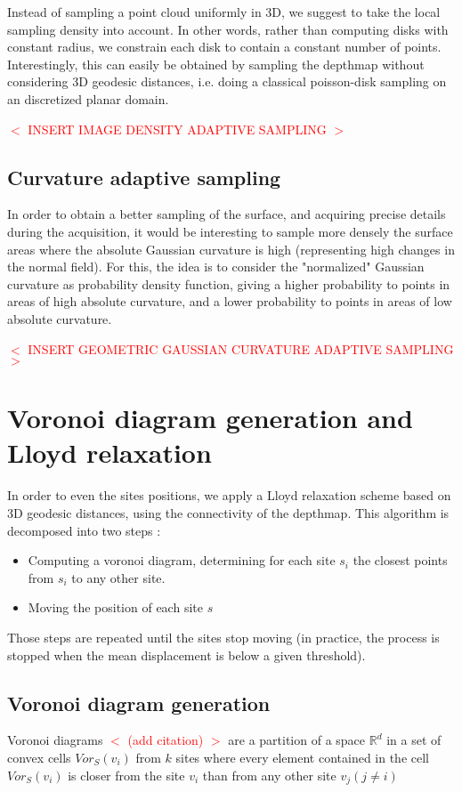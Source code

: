 \documentclass[11pt,fleqn]{book} %
\newcommand{\arnaud}[1]{\textcolor{red}{$<$ #1 $>$}}
\begin{document}
Instead of sampling a point cloud uniformly in 3D, we suggest to take the local sampling density into account. In other words, rather than computing disks with constant radius, we constrain each disk to contain a constant number of points.
Interestingly, this can easily be obtained by sampling the depthmap without considering 3D geodesic distances, i.e. doing a classical poisson-disk sampling on an discretized planar domain.

\arnaud{INSERT IMAGE DENSITY ADAPTIVE SAMPLING}

\subsection{Curvature adaptive sampling}
In order to obtain a better sampling of the surface, and acquiring precise details during the acquisition, it would be interesting to sample more densely the surface areas where the absolute Gaussian curvature is high (representing high changes in the normal field). For this, the idea is to consider the "normalized" Gaussian curvature as probability density function, giving a higher probability to points in areas of high absolute curvature, and a lower probability to points in areas of low absolute curvature.

\arnaud{INSERT GEOMETRIC GAUSSIAN CURVATURE ADAPTIVE SAMPLING}

\section{Voronoi diagram generation and Lloyd relaxation}
\label{sec:lloyd_relaxation}

In order to even the sites positions, we apply a Lloyd relaxation scheme based on 3D geodesic distances, using the connectivity of the depthmap.
This algorithm is decomposed into two steps : 
\begin{itemize}
	\item Computing a voronoi diagram, determining for each site $s_i$ the closest points from $s_i$ to any other site.
	\item Moving the position of each site $s$
\end{itemize}

Those steps are repeated until the sites stop moving (in practice, the process is stopped when the mean displacement is below a given threshold).

\subsection{Voronoi diagram generation}
Voronoi diagrams \arnaud{(add citation)} are a partition of a space $\mathbb{R}^d$ in a set of convex cells $Vor_S(v_i)$ from $k$ sites where every element contained in the cell $Vor_S(v_i)$ is closer from the site $v_i$ than from any other site $v_j (j \neq i)$
\end{document}
